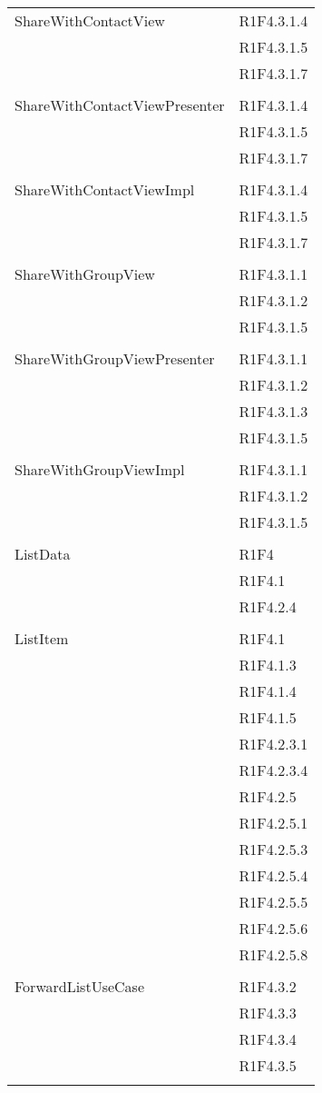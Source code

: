\begin{center}
\begin{longtable}{|p{7cm}|p{7cm}|}
		ShareWithContactView & R1F4.3.1.4 \\ & R1F4.3.1.5 \\ & R1F4.3.1.7 \\ & \\ \hline
		ShareWithContactViewPresenter & R1F4.3.1.4 \\ & R1F4.3.1.5 \\ & R1F4.3.1.7 \\ & \\ \hline
		ShareWithContactViewImpl & R1F4.3.1.4 \\ & R1F4.3.1.5 \\ & R1F4.3.1.7 \\ & \\ \hline
		ShareWithGroupView & R1F4.3.1.1 \\ & R1F4.3.1.2 \\ & R1F4.3.1.5 \\ & \\ \hline
		ShareWithGroupViewPresenter & R1F4.3.1.1 \\ & R1F4.3.1.2 \\ & R1F4.3.1.3 \\ & R1F4.3.1.5 \\ & \\ \hline
		ShareWithGroupViewImpl & R1F4.3.1.1 \\ & R1F4.3.1.2 \\ & R1F4.3.1.5 \\ & \\ \hline
		ListData & R1F4 \\ & R1F4.1 \\ & R1F4.2.4 \\ & \\ \hline
		ListItem & R1F4.1 \\ & R1F4.1.3 \\ & R1F4.1.4 \\ & R1F4.1.5 \\ & R1F4.2.3.1 \\ & R1F4.2.3.4 \\ & R1F4.2.5 \\ & R1F4.2.5.1 \\ & R1F4.2.5.3 \\ & R1F4.2.5.4 \\ & R1F4.2.5.5 \\ & R1F4.2.5.6 \\ & R1F4.2.5.8 \\ & \\ \hline
		ForwardListUseCase & R1F4.3.2 \\ & R1F4.3.3 \\ & R1F4.3.4 \\ & R1F4.3.5 \\ & \\ \hline

\end{longtable}
\end{center}

